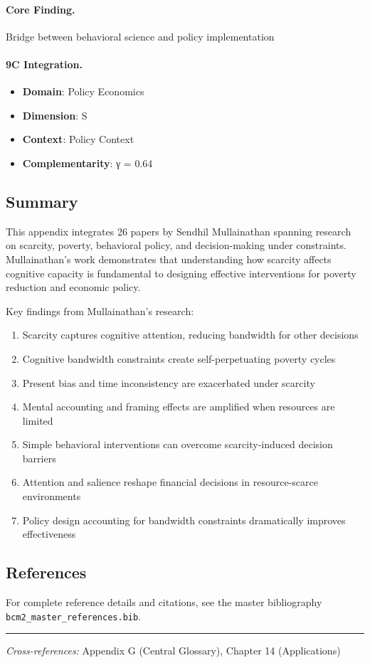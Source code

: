 \paragraph{Core Finding.}
Bridge between behavioral science and policy implementation

\paragraph{9C Integration.}
\begin{itemize}[nosep]
  \item \textbf{Domain}: Policy Economics
  \item \textbf{Dimension}: S
  \item \textbf{Context}: Policy Context
  \item \textbf{Complementarity}: γ = 0.64
\end{itemize}


\subsection{Summary}

This appendix integrates 26 papers by Sendhil Mullainathan spanning research on scarcity, poverty, behavioral policy, and decision-making under constraints. Mullainathan's work demonstrates that understanding how scarcity affects cognitive capacity is fundamental to designing effective interventions for poverty reduction and economic policy.

Key findings from Mullainathan's research:

\begin{enumerate}
  \item Scarcity captures cognitive attention, reducing bandwidth for other decisions
  \item Cognitive bandwidth constraints create self-perpetuating poverty cycles
  \item Present bias and time inconsistency are exacerbated under scarcity
  \item Mental accounting and framing effects are amplified when resources are limited
  \item Simple behavioral interventions can overcome scarcity-induced decision barriers
  \item Attention and salience reshape financial decisions in resource-scarce environments
  \item Policy design accounting for bandwidth constraints dramatically improves effectiveness
\end{enumerate}

\subsection{References}

For complete reference details and citations, see the master bibliography
\texttt{bcm2\_master\_references.bib}.

\vspace{1em}
\hrule
\vspace{0.5em}

\noindent\textit{Cross-references:}
Appendix G (Central Glossary), Chapter 14 (Applications)

